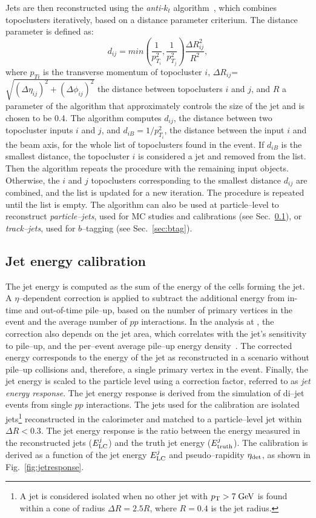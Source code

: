 Jets are then reconstructed using the {\it anti-$k_t$}
algorithm~\cite{antiktalgo}, which combines topoclusters iteratively,
based on a distance parameter criterium. The distance parameter is
defined as:
\begin{equation}
d_{ij}=min(\frac{1}{p_{T_i}^2},\frac{1}{p_{T_j}^2})\frac{\Delta R_{ij}^{2}}{R^{2}},
\end{equation}
where $p_{Ti}$ is the transverse momentum of topocluster $i$, 
$\Delta R_{ij}$=$\sqrt{(\Delta\eta_{ij})^{2}+(\Delta\phi_{ij})^{2}}$ the distance 
between topoclusters $i$ and
$j$, and $R$ a parameter of the algorithm that approximately controls the size
of the jet and is chosen to be 0.4.
The algorithm computes $d_{ij}$, the distance between two topocluster
inputs $i$ and $j$, and $d_{iB}=1/p_{T_i}^2$,  the distance between the input $i$
and the beam axis, for the whole list of topoclusters found in the
event. If $d_{iB}$ is the smallest distance, the
topocluster $i$ is considered a jet and removed from the list. Then the
algorithm repeats the procedure with the remaining input objects.
Otherwise, the $i$ and $j$ topoclusters corresponding to the smallest
distance $d_{ij}$ are combined, and the list is updated for a new
iteration.
The procedure is repeated until the list is empty.
The algorithm can also be used at particle--level to reconstruct {\it
  particle--jets}, used for MC studies and calibrations (see
Sec.~\ref{sec:jetcalib}), or {\it track--jets}, used for $b$--tagging
(see Sec.~\ref{sec:btag}). 

\subsection{Jet energy calibration}
\label{sec:jetcalib}

The jet energy is computed as the sum of the energy of the cells
forming the jet.
A \mbox{$\eta$--dependent} correction is applied to subtract the
additional energy from in-time and out-of-time pile--up, based on the
number of primary vertices in the event and the average number of $pp$
interactions. In the analysis at \eighttev{}, the correction also
depends on the jet area, which correlates with the jet's sensitivity
to pile--up, and the per--event average pile--up energy
density~\cite{Cacciari:2007fd}. The corrected energy corresponds to the energy of the
jet as reconstructed in a scenario without pile--up collisions and,
therefore, a single primary vertex in the event.
Finally, the jet energy is scaled to the particle level using a
correction factor, referred to as {\it jet energy response}.
The jet energy response is derived from the simulation of di--jet
events from single $pp$ interactions.
The jets used for the calibration are isolated jets\footnote{A jet is
  considered isolated when no other jet with $p_{\mathrm{T}}>7\; \mathrm{GeV}$
  is found within a cone of radius $\Delta R=2.5R$, where $R=0.4$ is
  the jet radius.}
reconstructed in the calorimeter and matched to a particle--level jet
within $\Delta R<0.3$.
The jet energy response is the ratio between the energy measured in
the reconstructed jets ($E_{\rm LC}^j$) and the truth jet energy
($E_{\rm truth}^j$). The calibration is derived as a function of the
jet energy $E_{\rm LC}^j$ and pseudo--rapidity $\eta_{\rm det}$, as
shown in Fig.~\ref{fig:jetresponse}.

